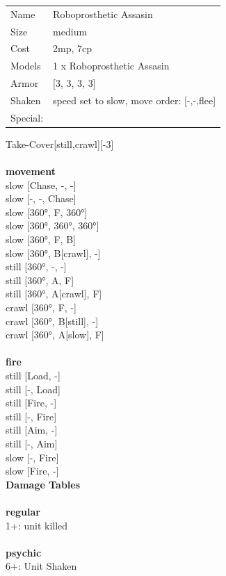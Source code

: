 {\begin{tabular}{ll}
  Name & Roboprosthetic Assasin \\
  Size & medium\\
  Cost & 2mp, 7cp\\
  Models & 1 x Roboprosthetic Assasin\\
  Armor & [3, 3, 3, 3]\\
  Shaken & speed set to slow, move order: [-,-,flee]\\
  Special: \\
\end{tabular}

\noindent Take-Cover[still,crawl][-3]\\ 


\ \\ {\bf movement } \\
slow [Chase, -, -] \\
slow [-, -, Chase] \\
slow [360°, F, 360°] \\
slow [360°, 360°, 360°] \\
slow [360°, F, B] \\
slow [360°, B[crawl], -] \\
still [360°, -, -] \\
still [360°, A, F] \\
still [360°, A[crawl], F] \\
crawl [360°, F, -] \\
crawl [360°, B[still], -] \\
crawl [360°, A[slow], F] \\
\ \\ {\bf fire } \\
still [Load, -] \\
still [-, Load] \\
still [Fire, -] \\
still [-, Fire] \\
still [Aim, -] \\
still [-, Aim] \\
slow [-, Fire] \\
slow [Fire, -] \\


{\bf Damage Tables} \\
\ \\ {\bf regular } \\
1+: unit killed \\
\ \\ {\bf psychic } \\
6+: Unit Shaken \\


}
